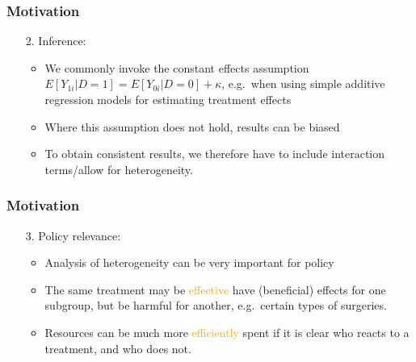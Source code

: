 \documentclass[12pt,english,dvipsnames,aspectratio=169,handout]{beamer}\usepackage[]{graphicx}\usepackage[]{xcolor}
\begin{document}
\begin{frame}
  \frametitle{Motivation}
\footnotesize

\begin{enumerate}
\item[2.] Inference:
    \begin{itemize} \footnotesize
    \item We commonly invoke the constant effects assumption  $E[Y_{1i}|D=1] =  E[Y_{0i}|D=0] + \kappa$, e.g.\ when using simple additive regression models for estimating treatment effects
    \item Where this assumption does not hold, results can be biased \cite{angrist_estimating_1998, elwert_effect_2010}
    \item To obtain consistent results, we therefore have to include interaction terms/allow for heterogeneity.
    \end{itemize}
\end{enumerate}
\vspace{3cm}

\end{frame}



\begin{frame}
  \frametitle{Motivation}
\footnotesize

\begin{enumerate}
\item[3.] Policy relevance: 
    \begin{itemize} \footnotesize
    \item Analysis of heterogeneity can be very important for policy
    \item The same treatment may be \textcolor{orange}{effective} have (beneficial) effects for one subgroup, but be harmful for another, e.g.\ certain types of surgeries. 
    \item Resources can be much more \textcolor{orange}{efficiently} spent if it is clear who reacts to a treatment, and who does not. 
    \end{itemize}
\end{enumerate}
\vspace{3cm}

\end{frame}
\end{document}
